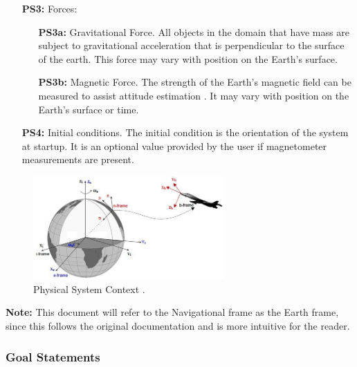 \documentclass[12pt]{article}
\begin{document}
\begin{itemize}
  \item[\textbf{PS3:}] Forces:
  \begin{itemize}
    \item[\textbf{PS3a:}] Gravitational Force. All objects in the domain that have mass are subject
    to gravitational acceleration that is perpendicular to the surface of the earth. This force may
    vary with position on the Earth's surface.
    \item[\textbf{PS3b:}] Magnetic Force. The strength of the Earth's magnetic field can be measured
    to assist attitude estimation \cite{magnet}. It may vary with position on the Earth's surface or
    time.
  \end{itemize}
  \item[\textbf{PS4:}] Initial conditions. The initial condition is the orientation of the system at
  startup. It is an optional value provided by the user if magnetometer measurements are present.
\end{itemize}

\begin{figure}[h!]
    \centerline{\includegraphics[width=0.65\textwidth, trim={0 0 0
    0},clip]{Reference-coordinates-frames-in-inertial-navigation-systems.png}} \caption{Physical
    System Context \cite{ins}.}
    \label{fig:ref_diag}
\end{figure}

\textbf{Note:} This document will refer to the Navigational frame as the Earth frame, since this
follows the original documentation \cite{madgwick_ecient_nodate} and is more intuitive for the
reader.


\subsubsection{Goal Statements}

\end{document}
